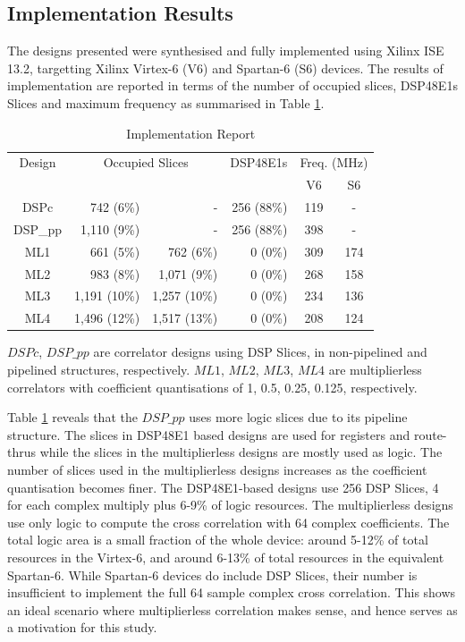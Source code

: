 \subsection{Implementation Results}

The designs presented were synthesised and fully implemented using Xilinx ISE 13.2, targetting Xilinx Virtex-6 (V6) and Spartan-6 (S6) devices.  
The results of implementation are reported in terms of the number of occupied slices, DSP48E1s Slices and maximum frequency as summarised in Table \ref{tab:Imp_Rpt}. 

\begin{table}[h]
	\centering
	\caption{Implementation Report}
	\label{tab:Imp_Rpt}
	\begin{tabular}{c|r|r|r|c|c}
        \hline \hline
    			Design  & \multicolumn{2}{|c|}{Occupied Slices} & DSP48E1s & \multicolumn{2}{|c}{Freq. (MHz)} \\
	\cline{2-6}			         & \makebox[1.2cm][c]{V6} & \makebox[1.2cm][c]{S6}& 	\makebox[1.2cm][c]{V6}	&  V6 & S6    \\
    	\hline
			DSPc 	& 742 		(6\%)  & -  			 & 256 (88\%) & 119 & -\\
			DSP\_pp &  1,110 	(9\%) & -  			 &  256 (88\%)& 398 & -\\
 			ML1 	&  661		(5\%) &	762 (6\%)	 &  0 (0\%)	& 309 & 174\\
			ML2 	&  983 	(8\%) &	1,071 (9\%) &  0 (0\%)	& 268 & 158\\
			ML3 	&  1,191 	(10\%) &	1,257 (10\%) &  0 (0\%)	& 234 & 136\\
			ML4 	&  1,496 	(12\%) &	1,517 (13\%) &  0 (0\%)	& 208 & 124\\   
    
    	\hline \hline  
    \end{tabular}	
\end{table}

$DSPc$, $DSP\_pp$ are correlator designs using DSP Slices, in non-pipelined and pipelined structures, respectively. 
$ML1$, $ML2$, $ML3$, $ML4$ are multiplierless correlators with coefficient quantisations of 1, 0.5, 0.25, 0.125, respectively.

Table \ref{tab:Imp_Rpt} reveals that the $DSP\_pp$ uses more logic slices due to its pipeline structure. 
The slices in DSP48E1 based designs are used for registers and route-thrus while the slices in the multiplierless designs are mostly used as logic. 
The number of slices used in the multiplierless designs increases as the coefficient quantisation becomes finer. 
The DSP48E1-based designs use 256 DSP Slices, 4 for each complex multiply plus 6-9\% of logic resources.
The multiplierless designs use only logic to compute the cross correlation with 64 complex coefficients. 
The total logic area is a small fraction of the whole device: around 5-12\% of total resources in the Virtex-6, and around 6-13\% of total resources in the equivalent Spartan-6.
While Spartan-6 devices do include DSP Slices, their number is insufficient to implement the full 64 sample complex cross correlation.
This shows an ideal scenario where multiplierless correlation makes sense, and hence serves as a motivation for this study.

